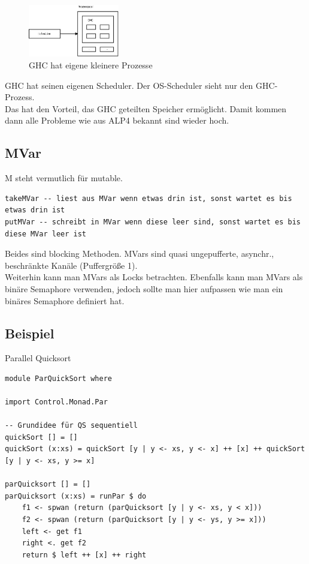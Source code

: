 \documentclass[ngerman,a4paper]{report}
\begin{document}
\begin{figure}[h]
	\centering
	\includegraphics[width=150px]{gfx/ghc-schedule.png}
	\caption{GHC hat eigene kleinere Prozesse}
	\label{img:ghc-sched}
\end{figure}
GHC hat seinen eigenen Scheduler. Der OS-Scheduler sieht nur den GHC-Prozess.\\
Das hat den Vorteil, das GHC geteilten Speicher ermöglicht. Damit kommen dann alle Probleme wie aus ALP4 bekannt sind wieder hoch.\\

\subsection{MVar}
M steht vermutlich für mutable.
\begin{lstlisting}
takeMVar -- liest aus MVar wenn etwas drin ist, sonst wartet es bis etwas drin ist
putMVar -- schreibt in MVar wenn diese leer sind, sonst wartet es bis diese MVar leer ist
\end{lstlisting}
Beides sind blocking Methoden. MVars sind quasi ungepufferte, asynchr., beschränkte Kanäle (Puffergröße 1).\\
Weiterhin kann man MVars als Locks betrachten. Ebenfalls kann man MVars als binäre Semaphore verwenden, jedoch sollte man hier aufpassen wie man ein binäres Semaphore definiert hat.\\

\subsection{Beispiel}
Parallel Quicksort
\begin{lstlisting}
module ParQuickSort where

import Control.Monad.Par

-- Grundidee für QS sequentiell
quickSort [] = []
quickSort (x:xs) = quickSort [y | y <- xs, y <- x] ++ [x] ++ quickSort [y | y <- xs, y >= x]

parQuicksort [] = []
parQuicksort (x:xs) = runPar $ do
	f1 <- spwan (return (parQuicksort [y | y <- xs, y < x])) 
	f2 <- spwan (return (parQuicksort [y | y <- ys, y >= x]))
	left <- get f1
	right <. get f2
	return $ left ++ [x] ++ right
\end{lstlisting}
\end{document}
